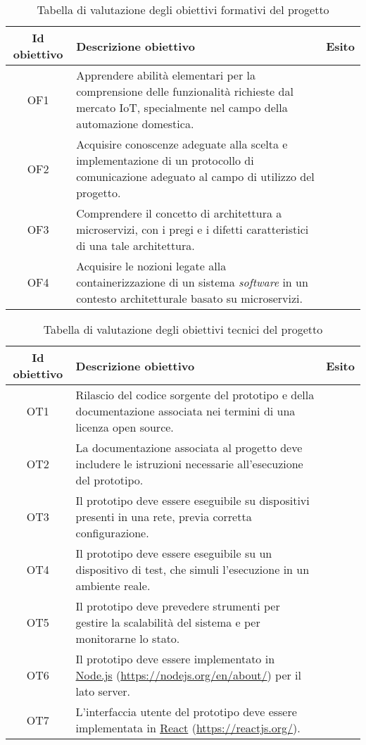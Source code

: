 \begin{table}[H]
\caption{Tabella di valutazione degli obiettivi formativi del progetto}
\label{tab:esito-obiettivi-formativi}
\begin{tabularx}{\linewidth}{|c|X|c|}
\hline
\textbf{Id obiettivo} & \textbf{Descrizione obiettivo} & \textbf{Esito}\\
\hline
\label{OF1} OF1 & Apprendere abilità elementari per la comprensione delle funzionalità richieste dal mercato IoT, specialmente nel campo della automazione domestica. \\
\hline
\label{OF2} OF2 & Acquisire conoscenze adeguate alla scelta e implementazione di un protocollo di comunicazione adeguato al campo di utilizzo del progetto. \\
\hline
\label{OF3} OF3 & Comprendere il concetto di architettura a microservizi, con i pregi e i difetti caratteristici di una tale architettura. \\
\hline
\label{OF4} OF4 & Acquisire le nozioni legate alla containerizzazione di un sistema \emph{software} in un contesto architetturale basato su microservizi. \\
\hline
\end{tabularx}
\end{table}

\begin{table}[H]
\caption{Tabella di valutazione degli obiettivi tecnici del progetto}
\label{tab:esito-obiettivi-tecnici}
\begin{tabularx}{\linewidth}{|c|X|c|}
\hline
\textbf{Id obiettivo} & \textbf{Descrizione obiettivo} & \textbf{Esito}\\
\hline
\label{OT1} OT1 & Rilascio del codice sorgente del prototipo e della documentazione associata nei termini di una licenza \gls{open source}. \\
\hline
\label{OT2} OT2 & La documentazione associata al progetto deve includere le istruzioni necessarie all'esecuzione del prototipo. \\
\hline
\label{OT3} OT3 & Il prototipo deve essere eseguibile su dispositivi presenti in una rete, previa corretta configurazione. \\
\hline
\label{OT4} OT4 & Il prototipo deve essere eseguibile su un dispositivo di test, che simuli l'esecuzione in un ambiente reale. \\
\hline
\label{OT5} OT5 & Il prototipo deve prevedere strumenti per gestire la scalabilità del sistema e per monitorarne lo stato. \\
\hline
\label{OT6} OT6 & Il prototipo deve essere implementato in \href{https://nodejs.org/en/about/}{Node.js} (\url{https://nodejs.org/en/about/}) per il lato server. \\
\hline
\label{OT7} OT7 & L'interfaccia utente del prototipo deve essere implementata in \href{https://reactjs.org/}{React} (\url{https://reactjs.org/}). \\
\hline
\end{tabularx}
\end{table}


